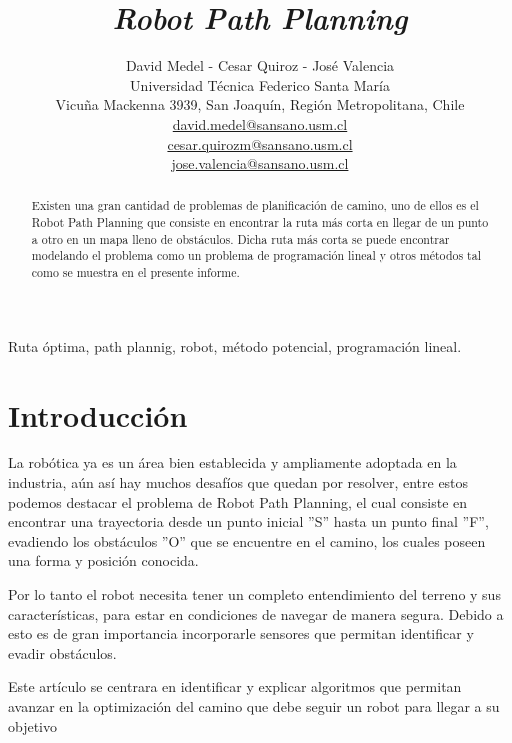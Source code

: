 \documentclass[journal, 10pt]{IEEEtran}
\begin{document}
\title{\textit{Robot Path Planning}}
\author{David Medel - Cesar Quiroz - José Valencia\\ Universidad T\'ecnica Federico Santa Mar\'ia \\
Vicuña Mackenna 3939, San Joaquín, Región Metropolitana, Chile \\
\href{mailto:david.medel@sansano.usm.cl}{david.medel@sansano.usm.cl}\\
\href{mailto:cesar.quirozm@sansano.usm.cl}{cesar.quirozm@sansano.usm.cl}\\
\href{mailto:jose.valencia@sansano.usm.cl}{jose.valencia@sansano.usm.cl} }
\maketitle

\begin{abstract}
\boldmath Existen una gran cantidad de problemas de planificación de camino, uno de ellos es el Robot Path Planning que consiste en encontrar la ruta más corta en llegar de un punto a otro en un mapa lleno de obstáculos. Dicha ruta más corta se puede encontrar modelando el problema como un problema de programación lineal y otros métodos tal como se muestra en el presente informe.
\end{abstract}

\begin{IEEEkeywords}
Ruta óptima, path plannig, robot, método potencial, programación lineal.
\end{IEEEkeywords}

\section{Introducción}
La robótica ya es un área bien establecida\cite{Robotica:2012} y ampliamente adoptada en la industria, aún así hay muchos desafíos que quedan por resolver, entre estos podemos destacar el problema de Robot Path Planning, el cual consiste en encontrar una trayectoria desde un punto inicial ''S'' hasta un punto final ''F'', evadiendo los obstáculos ''O'' que se encuentre en el camino, los cuales poseen una forma y posición conocida.

Por lo tanto el robot necesita tener un completo entendimiento del terreno y sus características, para estar en condiciones de navegar de manera segura. Debido a esto  es de gran importancia incorporarle sensores que permitan identificar y evadir obstáculos.

Este artículo se centrara en identificar y explicar algoritmos que permitan avanzar en la optimización del camino que debe seguir un robot para llegar a su objetivo\\
\end{document}
